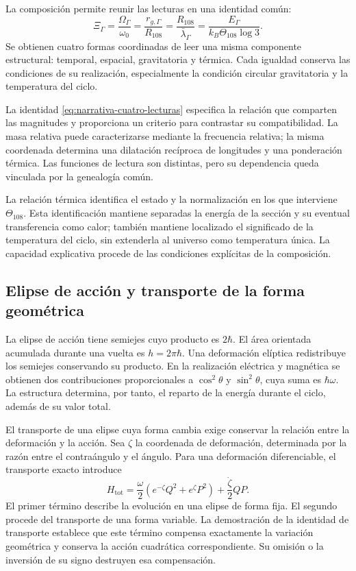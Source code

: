 La composición permite reunir las lecturas en una identidad común:
\begin{equation}
 \boxed{
 \Xi_\Gamma
 =\frac{\Omega_\Gamma}{\omega_0}
 =\frac{r_{g,\Gamma}}{R_{108}}
 =\frac{R_{108}}{\bar\lambda_\Gamma}
 =\frac{E_\Gamma}{k_B\Theta_{108}\log3}.}
 \label{eq:narrativa-cuatro-lecturas}
\end{equation}
Se obtienen cuatro formas coordinadas de leer una misma componente
estructural: temporal, espacial, gravitatoria y térmica. Cada igualdad
conserva las condiciones de su realización, especialmente la condición
circular gravitatoria y la temperatura del ciclo.

La identidad \eqref{eq:narrativa-cuatro-lecturas} especifica la relación
que comparten las magnitudes y proporciona un criterio para contrastar su
compatibilidad. La masa relativa puede caracterizarse mediante la frecuencia
relativa; la misma coordenada determina una dilatación recíproca de
longitudes y una ponderación térmica. Las funciones de lectura son distintas,
pero su dependencia queda vinculada por la genealogía común.

La relación térmica identifica el estado y la normalización en los que
interviene $\Theta_{108}$. Esta identificación mantiene separadas la energía
de la sección y su eventual transferencia como calor; también mantiene
localizado el significado de la temperatura del ciclo, sin extenderla al
universo como temperatura única. La capacidad explicativa procede de las
condiciones explícitas de la composición.

\subsection{Elipse de acción y transporte de la forma geométrica}
\label{subsec:narrativa-elipse-transporte}

La elipse de acción tiene semiejes cuyo producto es $2\hbar$. El área
orientada acumulada durante una vuelta es $h=2\pi\hbar$. Una deformación
elíptica redistribuye los semiejes conservando su producto. En la
realización eléctrica y magnética se obtienen dos contribuciones
proporcionales a $\cos^2\theta$ y $\sin^2\theta$, cuya suma es
$\hbar\omega$. La estructura determina, por tanto, el reparto de la
energía durante el ciclo, además de su valor total.

El transporte de una elipse cuya forma cambia exige conservar la relación
entre la deformación y la acción. Sea $\zeta$ la coordenada de deformación,
determinada por la razón entre el contraángulo y el ángulo. Para una
deformación diferenciable, el transporte exacto introduce
\begin{equation}
 H_{\mathrm{tot}}
 =\frac{\omega}{2}
   \left(e^{-\zeta}Q^2+e^\zeta P^2\right)
  +\frac{\dot\zeta}{2}QP.
 \label{eq:narrativa-hamiltoniano-transporte}
\end{equation}
El primer término describe la evolución en una elipse de forma fija.
El segundo procede del transporte de una forma variable. La demostración
de la identidad de transporte establece que este término compensa
exactamente la variación geométrica y conserva la acción cuadrática
correspondiente. Su omisión o la inversión de su signo destruyen esa
compensación.

